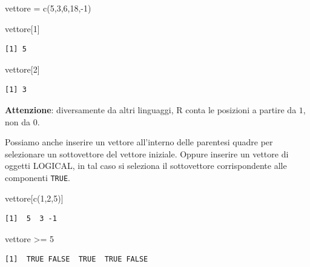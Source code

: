 \documentclass[
  italian,
  letterpaper,
]{book}
\newenvironment{Shaded}{\begin{snugshade}}{\end{snugshade}}
\newcommand{\DecValTok}[1]{\textcolor[rgb]{0.68,0.00,0.00}{#1}}
\newcommand{\FunctionTok}[1]{\textcolor[rgb]{0.28,0.35,0.67}{#1}}
\newcommand{\NormalTok}[1]{\textcolor[rgb]{0.00,0.23,0.31}{#1}}
\newcommand{\OtherTok}[1]{\textcolor[rgb]{0.00,0.23,0.31}{#1}}
\newcommand{\SpecialCharTok}[1]{\textcolor[rgb]{0.37,0.37,0.37}{#1}}
\theoremstyle{definition}
\theoremstyle{remark}
\begin{document}
\begin{Shaded}
\begin{Highlighting}[]
\NormalTok{vettore }\OtherTok{=} \FunctionTok{c}\NormalTok{(}\DecValTok{5}\NormalTok{,}\DecValTok{3}\NormalTok{,}\DecValTok{6}\NormalTok{,}\DecValTok{18}\NormalTok{,}\SpecialCharTok{{-}}\DecValTok{1}\NormalTok{)}

\NormalTok{vettore[}\DecValTok{1}\NormalTok{]}
\end{Highlighting}
\end{Shaded}

\begin{verbatim}
[1] 5
\end{verbatim}

\begin{Shaded}
\begin{Highlighting}[]
\NormalTok{vettore[}\DecValTok{2}\NormalTok{]}
\end{Highlighting}
\end{Shaded}

\begin{verbatim}
[1] 3
\end{verbatim}

\textbf{Attenzione}: diversamente da altri linguaggi, R conta le
posizioni a partire da \(1\), non da \(0\).

Possiamo anche inserire un vettore all'interno delle parentesi quadre
per selezionare un sottovettore del vettore iniziale. Oppure inserire un
vettore di oggetti LOGICAL, in tal caso si seleziona il sottovettore
corrispondente alle componenti \texttt{TRUE}.

\begin{Shaded}
\begin{Highlighting}[]
\NormalTok{vettore[}\FunctionTok{c}\NormalTok{(}\DecValTok{1}\NormalTok{,}\DecValTok{2}\NormalTok{,}\DecValTok{5}\NormalTok{)]}
\end{Highlighting}
\end{Shaded}

\begin{verbatim}
[1]  5  3 -1
\end{verbatim}

\begin{Shaded}
\begin{Highlighting}[]
\NormalTok{vettore }\SpecialCharTok{\textgreater{}=} \DecValTok{5}
\end{Highlighting}
\end{Shaded}

\begin{verbatim}
[1]  TRUE FALSE  TRUE  TRUE FALSE
\end{verbatim}
\end{document}

